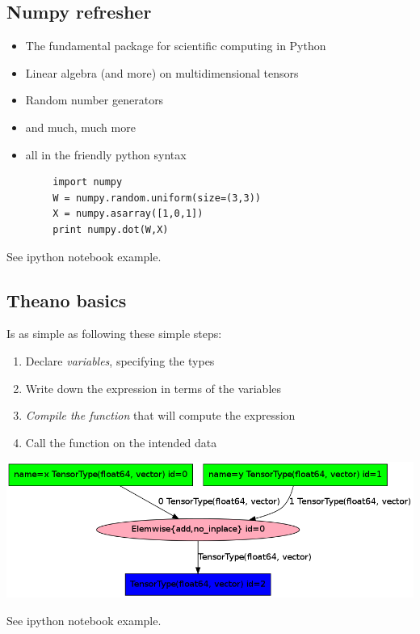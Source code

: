 \documentclass[9pt]{beamer}
\begin{document}
\subsection{Numpy refresher}
\begin{frame}[fragile]
    \begin{itemize}
        \item The fundamental package for scientific computing in Python
        \item Linear algebra (and more) on multidimensional tensors
        \item Random number generators 
        \item and much, much more
        \item all in the friendly python syntax
    \end{itemize}
    \bigskip
    \begin{verbatim}
        import numpy
        W = numpy.random.uniform(size=(3,3))
        X = numpy.asarray([1,0,1])
        print numpy.dot(W,X)
    \end{verbatim}

    See ipython notebook example.
\end{frame}
\subsection{Theano basics}
\begin{frame}
    Is as simple as following these simple steps:
    \begin{enumerate}
        \item Declare {\it variables}, specifying the types
        \item Write down the expression in terms of the variables
        \item {\it Compile the function} that will compute the expression
        \item Call the function on the intended data 
    \end{enumerate}
    \includegraphics[width=.8\textwidth]{pics/compgraph1.png} 
    \bigskip
    \begin{center}
    See ipython notebook example.
    \end{center}
\end{frame}
\end{document}
